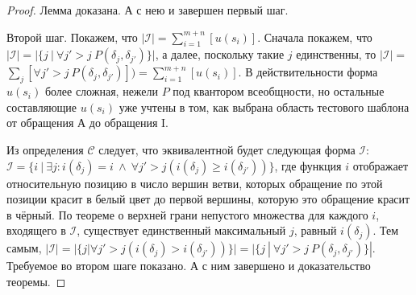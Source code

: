 \begin{proof}
   Лемма доказана. А с нею и завершен первый шаг.

   Второй шаг. Покажем, что $|\mathcal{I}| = \sum_{i=1}^{m+n} [u(s_i)]$. Сначала покажем, что $|\mathcal{I}| = |\{ j ~|~ \forall j' {>} j ~ P(\delta_j, \delta_{j'}) \}|$, а далее, поскольку такие $j$ единственны, то $|\mathcal{I}| =$\\ $\sum_j [\forall j' {>} j ~ P(\delta_j, \delta_{j'})]) =  \sum_{i=1}^{m+n} [u(s_i)]$. В действительности форма $u(s_i)$ более сложная, нежели $P$ под квантором всеобщности, но остальные составляющие $u(s_i)$ уже учтены в том, как выбрана область тестового шаблона от обращения А до обращения I.

   Из определения $\mathcal{C}$ следует, что эквивалентной будет следующая форма $\mathcal{I}$: $\mathcal{I} = \{i ~|~ \exists j : i(\delta_j) = i ~\wedge~ \forall j' > j ( i(\delta_j) \geqslant i(\delta_{j'}) ) \}$, где функция $i$ отображает относительную позицию в число вершин ветви, которых обращение по этой позиции красит в белый цвет до первой вершины, которую это обращение красит в чёрный. По теореме о верхней грани непустого множества для каждого $i$, входящего в $\mathcal{I}$, существует единственный максимальный $j$, равный $i(\delta_j)$. Тем самым, $|\mathcal{I}| = |\{j | \forall j' > j ( i(\delta_j) > i(\delta_{j'}) ) \}| = |\{ j ~|~ \forall j' {>} j ~ P(\delta_j, \delta_{j'}) \}|$. Требуемое во втором шаге показано. А с ним завершено и доказательство теоремы.
\end{proof} 
